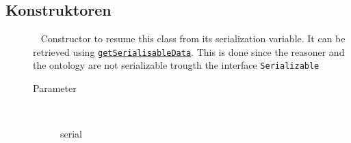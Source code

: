\subsection{Konstruktoren}
\begin{description}
\item[{\label{ontologyFramework.OFContextManagement.OWLReferences(ontologyFramework.OFContextManagement.OWLReferencesSerializable)}}]
~ Constructor to resume this class from its serialization
 variable. It can be retrieved using \texttt{\hyperlink{ontologyFramework.OFContextManagement.OWLReferences.getSerialisableData(java.lang.String)}{getSerialisableData}}.
 This is done since the reasoner and the ontology are not
 serializable trougth the interface \texttt{Serializable}
\begin{description}
\item[Parameter] ~
\begin{description}
\item[serial]


\end{description}
\end{description}
\end{description}
